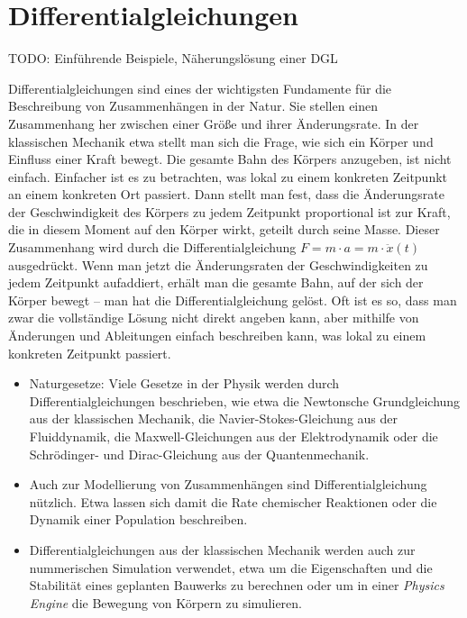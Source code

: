 \chapter{Differentialgleichungen}

TODO: Einführende Beispiele, Näherungslösung einer DGL

Differentialgleichungen sind eines der wichtigsten Fundamente für die Beschreibung von Zusammenhängen in der Natur. Sie stellen einen Zusammenhang her zwischen einer Größe und ihrer Änderungsrate. In der klassischen Mechanik etwa stellt man sich die Frage, wie sich ein Körper und Einfluss einer Kraft bewegt. Die gesamte Bahn des Körpers anzugeben, ist nicht einfach. Einfacher ist es zu betrachten, was lokal zu einem konkreten Zeitpunkt an einem konkreten Ort passiert. Dann stellt man fest, dass die Änderungsrate der Geschwindigkeit des Körpers zu jedem Zeitpunkt proportional ist zur Kraft, die in diesem Moment auf den Körper wirkt, geteilt durch seine Masse. Dieser Zusammenhang wird durch die Differentialgleichung $F=m\cdot a = m \cdot \ddot{x}(t)$ ausgedrückt. Wenn man jetzt die Änderungsraten der Geschwindigkeiten zu jedem Zeitpunkt aufaddiert, erhält man die gesamte Bahn, auf der sich der Körper bewegt -- man hat die Differentialgleichung gelöst. Oft ist es so, dass man zwar die vollständige Lösung nicht direkt angeben kann, aber mithilfe von Änderungen und Ableitungen einfach beschreiben kann, was lokal zu einem konkreten Zeitpunkt passiert.

\begin{itemize}
    \item Naturgesetze: Viele Gesetze in der Physik werden durch Differentialgleichungen beschrieben, wie etwa die Newtonsche Grundgleichung aus der klassischen Mechanik, die Navier-Stokes-Gleichung aus der Fluiddynamik, die Maxwell-Gleichungen aus der Elektrodynamik oder die Schrödinger- und Dirac-Gleichung aus der Quantenmechanik.
    \item Auch zur Modellierung von Zusammenhängen sind Differentialgleichung nützlich. Etwa lassen sich damit die Rate chemischer Reaktionen oder die Dynamik einer Population beschreiben.
    \item Differentialgleichungen aus der klassischen Mechanik werden auch zur nummerischen Simulation verwendet, etwa um die Eigenschaften und die Stabilität eines geplanten Bauwerks zu berechnen oder um in einer \emph{Physics Engine} die Bewegung von Körpern zu simulieren.
\end{itemize}

